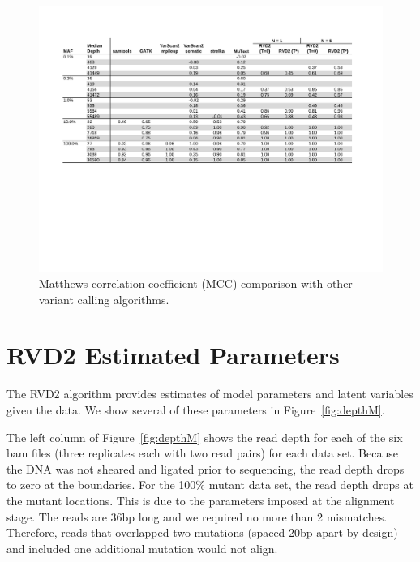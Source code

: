 \documentclass[11pt,reqno]{amsart}
\begin{document}
\begin{figure}[h]
\begin{center}
\includegraphics[width=140mm]{pdf_figs/comparison_table_mcc.pdf}
\caption{Matthews correlation coefficient (MCC) comparison with other variant calling algorithms.}
\label{fig:comparison_mcc}
\end{center}
\end{figure}



\section{RVD2 Estimated Parameters}\label{sec:synthetic_estimate}
The RVD2 algorithm provides estimates of model parameters and latent variables given the data. We show several of these parameters in Figure~\ref{fig:depthM}. 

The left column of Figure~\ref{fig:depthM} shows the read depth for each of the six bam files (three replicates each with two read pairs) for each data set. Because the DNA was not sheared and ligated prior to sequencing, the read depth drops to zero at the boundaries. For the 100\% mutant data set, the read depth drops at the mutant locations. This is due to the parameters imposed at the alignment stage. The reads are 36bp long and we required no more than 2 mismatches. Therefore, reads that overlapped two mutations (spaced 20bp apart by design) and included one additional mutation would not align.
\end{document}
